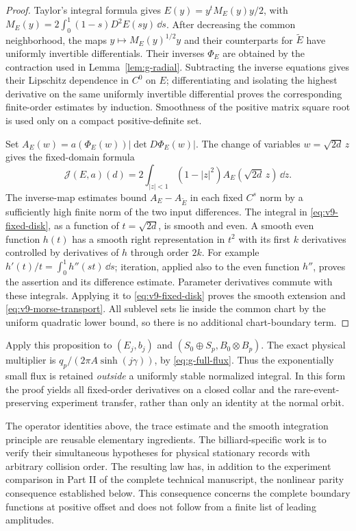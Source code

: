 \begin{proof}
Taylor's integral formula gives $E(y)=y^tM_E(y)y/2$, with
$M_E(y)=2\int_0^1(1-s)D^2E(sy)\,\dd s$.
After decreasing the common neighborhood, the maps
$y\mapsto M_E(y)^{1/2}y$ and their counterparts for $\widetilde E$
have uniformly invertible differentials. Their inverses $\Phi_E$
are obtained by the contraction used in Lemma~\ref{lem:g-radial}.
Subtracting the inverse equations gives their Lipschitz dependence
in $C^0$ on $E$; differentiating and isolating the highest derivative
on the same uniformly invertible differential proves the corresponding
finite-order estimates by induction. Smoothness of the positive matrix
square root is used only on a compact positive-definite set.

Set $A_E(w)=a(\Phi_E(w))|\det D\Phi_E(w)|$. The change of variables
$w=\sqrt{2d}\,z$ gives the fixed-domain formula
\begin{equation}\label{eq:v9-fixed-disk}
 \mathcal J(E,a)(d)=
          2\int_{|z|<1}(1-|z|^2)A_E(\sqrt{2d}\,z)\,\dd z.
\end{equation}
The inverse-map estimates bound $A_E-A_{\widetilde E}$ in each fixed
$C^s$ norm by a sufficiently high finite norm of the two input
differences. The integral in \eqref{eq:v9-fixed-disk}, as a function
of $t=\sqrt{2d}$, is smooth and even. A smooth even function $h(t)$
has a smooth right representation in $t^2$ with its first $k$
derivatives controlled by derivatives of $h$ through order $2k$.
For example $h'(t)/t=\int_0^1h''(st)\,\dd s$; iteration, applied
also to the even function $h''$, proves the assertion and its
difference estimate. Parameter derivatives commute with these
integrals. Applying it to \eqref{eq:v9-fixed-disk} proves the smooth
extension and \eqref{eq:v9-morse-transport}. All sublevel sets lie
inside the common chart by the uniform quadratic lower bound, so
there is no additional chart-boundary term.
\end{proof}

Apply this proposition to $(E_j,b_j)$ and
$(S_0\oplus S_p,B_0\otimes B_p)$. The exact physical multiplier is
$q_p/(2\pi A\sinh(j\gamma))$, by
\eqref{eq:g-full-flux}. Thus the exponentially small flux is retained
\emph{outside} a uniformly stable normalized integral. In this form
the proof yields all fixed-order derivatives on a closed collar and
the rare-event-preserving experiment transfer, rather than only an
identity at the normal orbit.

The operator identities above, the trace estimate and the smooth
integration principle are reusable elementary ingredients. The
billiard-specific work is to verify their simultaneous hypotheses for
physical stationary records with arbitrary collision order. The
resulting law has, in addition to the experiment comparison in Part II of the complete technical manuscript,
the nonlinear parity consequence established below. This
consequence concerns the complete boundary functions at positive
offset and does not follow from a finite list of leading amplitudes.
